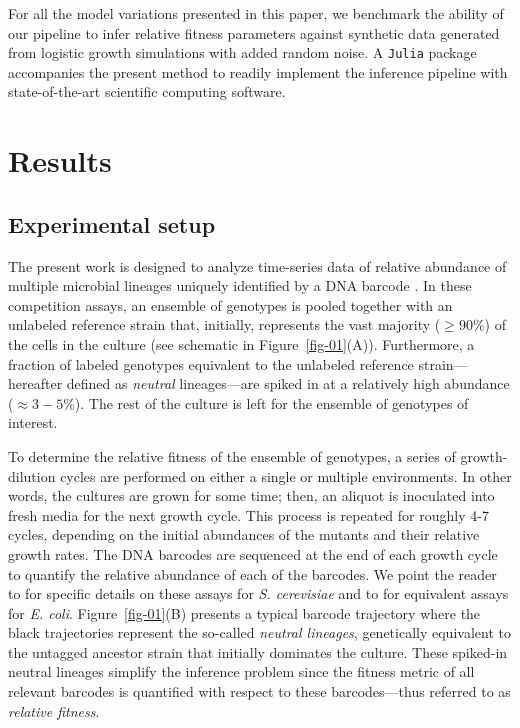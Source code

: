 \documentclass[
  letterpaper,
  DIV=11,
  numbers=noendperiod]{scrartcl}
\begin{document}
\begin{refsegment}
For all the model variations presented in this paper, we benchmark the
ability of our pipeline to infer relative fitness parameters against
synthetic data generated from logistic growth simulations with added
random noise. A \texttt{Julia} package accompanies the present method to
readily implement the inference pipeline with state-of-the-art
scientific computing software.

\hypertarget{results}{%
\section{Results}\label{results}}

\hypertarget{sec-experiment}{%
\subsection{Experimental setup}\label{sec-experiment}}

The present work is designed to analyze time-series data of relative
abundance of multiple microbial lineages uniquely identified by a DNA
barcode \autocite{kinsler2020,ascensao2023}. In these competition
assays, an ensemble of genotypes is pooled together with an unlabeled
reference strain that, initially, represents the vast majority
(\(\geq 90\%\)) of the cells in the culture (see schematic in
Figure~\ref{fig-01}(A)). Furthermore, a fraction of labeled genotypes
equivalent to the unlabeled reference strain---hereafter defined as
\emph{neutral} lineages---are spiked in at a relatively high abundance
(\(\approx 3-5\%\)). The rest of the culture is left for the ensemble of
genotypes of interest.

To determine the relative fitness of the ensemble of genotypes, a series
of growth-dilution cycles are performed on either a single or multiple
environments. In other words, the cultures are grown for some time;
then, an aliquot is inoculated into fresh media for the next growth
cycle. This process is repeated for roughly 4-7 cycles, depending on the
initial abundances of the mutants and their relative growth rates. The
DNA barcodes are sequenced at the end of each growth cycle to quantify
the relative abundance of each of the barcodes. We point the reader to
\textcite{kinsler2020} for specific details on these assays for \emph{S.
cerevisiae} and to \textcite{ascensao2023} for equivalent assays for
\emph{E. coli}. Figure~\ref{fig-01}(B) presents a typical barcode
trajectory where the black trajectories represent the so-called
\emph{neutral lineages}, genetically equivalent to the untagged ancestor
strain that initially dominates the culture. These spiked-in neutral
lineages simplify the inference problem since the fitness metric of all
relevant barcodes is quantified with respect to these barcodes---thus
referred to as \emph{relative fitness}.


\end{refsegment}
\end{document}
